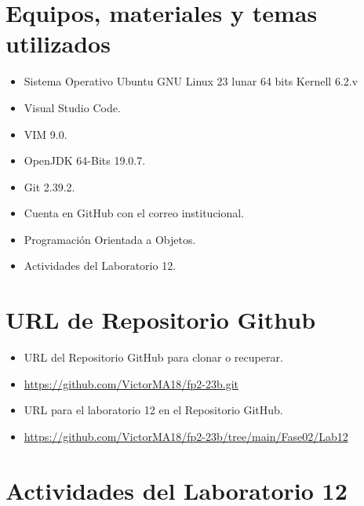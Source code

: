 \documentclass{article}
\begin{document}
	\section{Equipos, materiales y temas utilizados}
	\begin{itemize}
		\item Sistema Operativo Ubuntu GNU Linux 23 lunar 64 bits Kernell 6.2.v
		\item Visual Studio Code.
		\item VIM 9.0.
		\item OpenJDK 64-Bits 19.0.7.
		\item Git 2.39.2.
		\item Cuenta en GitHub con el correo institucional.
		\item Programación Orientada a Objetos.
		\item Actividades del Laboratorio 12.	
	\end{itemize}
	
	\section{URL de Repositorio Github}
	\begin{itemize}
		\item URL del Repositorio GitHub para clonar o recuperar.
		\item \url{https://github.com/VictorMA18/fp2-23b.git}
		\item URL para el laboratorio 12 en el Repositorio GitHub.
		\item \url{https://github.com/VictorMA18/fp2-23b/tree/main/Fase02/Lab12}
	\end{itemize}
	
	\section{Actividades del Laboratorio 12}
\end{document}
